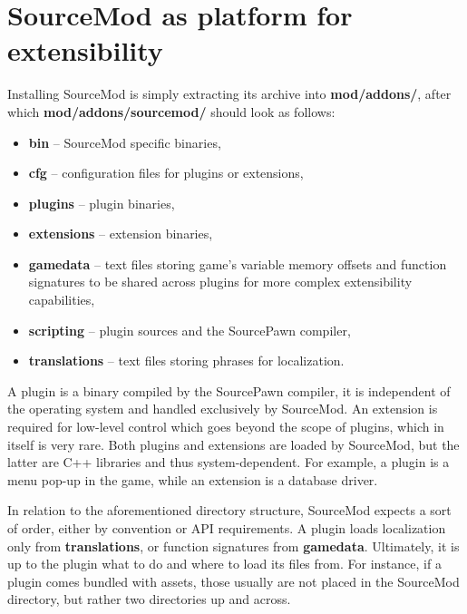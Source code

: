 \section{SourceMod as platform for extensibility}

Installing SourceMod is simply extracting its archive into \textbf{mod/addons/}, after which \textbf{mod/addons/sourcemod/} should look as follows:
\begin{itemize}
    \item \textbf{bin} -- SourceMod specific binaries,
    \item \textbf{cfg} -- configuration files for plugins or extensions,
    \item \textbf{plugins} -- plugin binaries,
    \item \textbf{extensions} -- extension binaries,
    \item \textbf{gamedata} -- text files storing game's variable memory offsets and function signatures to be shared across plugins for more complex extensibility capabilities,
    \item \textbf{scripting} -- plugin sources and the SourcePawn compiler,
    \item \textbf{translations} -- text files storing phrases for localization.
\end{itemize}

A plugin is a binary compiled by the SourcePawn compiler, it is independent of the operating system and handled exclusively by SourceMod.
An extension is required for low-level control which goes beyond the scope of plugins, which in itself is very rare.
Both plugins and extensions are loaded by SourceMod, but the latter are C++ libraries and thus system-dependent.
For example, a plugin is a menu pop-up in the game, while an extension is a database driver.

In relation to the aforementioned directory structure, SourceMod expects a sort of order, either by convention or API requirements.
A plugin loads localization only from \textbf{translations}, or function signatures from \textbf{gamedata}.
Ultimately, it is up to the plugin what to do and where to load its files from.
For instance, if a plugin comes bundled with assets, those usually are not placed in the SourceMod directory, but rather two directories up and across.
